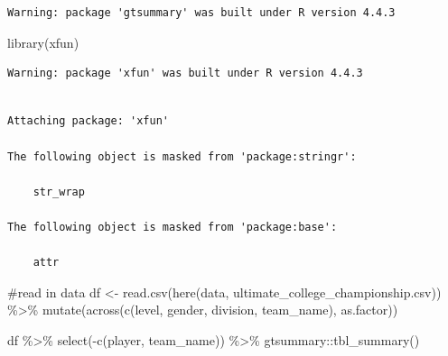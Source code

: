 \documentclass[
  letterpaper,
  DIV=11,
  numbers=noendperiod]{scrartcl}
\newenvironment{Shaded}{\begin{snugshade}}{\end{snugshade}}
\newcommand{\CommentTok}[1]{\textcolor[rgb]{0.37,0.37,0.37}{#1}}
\newcommand{\FunctionTok}[1]{\textcolor[rgb]{0.28,0.35,0.67}{#1}}
\newcommand{\NormalTok}[1]{\textcolor[rgb]{0.00,0.23,0.31}{#1}}
\newcommand{\OtherTok}[1]{\textcolor[rgb]{0.00,0.23,0.31}{#1}}
\newcommand{\SpecialCharTok}[1]{\textcolor[rgb]{0.37,0.37,0.37}{#1}}
\newcommand{\StringTok}[1]{\textcolor[rgb]{0.13,0.47,0.30}{#1}}
\begin{document}
\begin{verbatim}
Warning: package 'gtsummary' was built under R version 4.4.3
\end{verbatim}

\begin{Shaded}
\begin{Highlighting}[]
\FunctionTok{library}\NormalTok{(xfun)}
\end{Highlighting}
\end{Shaded}

\begin{verbatim}
Warning: package 'xfun' was built under R version 4.4.3
\end{verbatim}

\begin{verbatim}

Attaching package: 'xfun'

The following object is masked from 'package:stringr':

    str_wrap

The following object is masked from 'package:base':

    attr
\end{verbatim}

\begin{Shaded}
\begin{Highlighting}[]
\CommentTok{\#read in data}
\NormalTok{df }\OtherTok{\textless{}{-}} \FunctionTok{read.csv}\NormalTok{(}\FunctionTok{here}\NormalTok{(}\StringTok{\textquotesingle{}data\textquotesingle{}}\NormalTok{, }\StringTok{\textquotesingle{}ultimate\_college\_championship.csv\textquotesingle{}}\NormalTok{)) }\SpecialCharTok{\%\textgreater{}\%}
  \FunctionTok{mutate}\NormalTok{(}\FunctionTok{across}\NormalTok{(}\FunctionTok{c}\NormalTok{(level, gender, division, team\_name), as.factor))}



\NormalTok{df }\SpecialCharTok{\%\textgreater{}\%} \FunctionTok{select}\NormalTok{(}\SpecialCharTok{{-}}\FunctionTok{c}\NormalTok{(player, team\_name)) }\SpecialCharTok{\%\textgreater{}\%}\NormalTok{ gtsummary}\SpecialCharTok{::}\FunctionTok{tbl\_summary}\NormalTok{()}
\end{Highlighting}
\end{Shaded}
\end{document}
